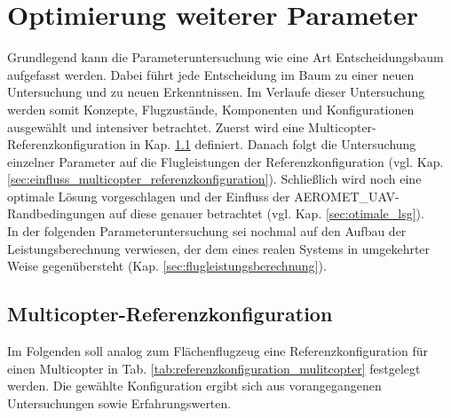 \chapter{Optimierung weiterer Parameter}
\label{chap:optimierung_parameter}
Grundlegend kann die Parameteruntersuchung wie eine Art Entscheidungsbaum aufgefasst werden. Dabei führt jede Entscheidung im Baum zu einer neuen Untersuchung und zu neuen Erkenntnissen. Im Verlaufe dieser Untersuchung werden somit Konzepte, Flugzustände, Komponenten und Konfigurationen ausgewählt und intensiver betrachtet. Zuerst wird eine Multicopter-Referenzkonfiguration in Kap. \ref{sec:multicopter_referenzkonfig} definiert. Danach folgt die Untersuchung einzelner Parameter auf die Flugleistungen der Referenzkonfiguration (vgl. Kap. \ref{sec:einfluss_multicopter_referenzkonfiguration}). Schließlich wird noch eine optimale Lösung vorgeschlagen und der Einfluss der AEROMET\_UAV-Randbedingungen auf diese genauer betrachtet (vgl. Kap. \ref{sec:otimale_lsg}).\\
In der folgenden Parameteruntersuchung sei nochmal auf den Aufbau der Leistungsberechnung verwiesen, der dem eines realen Systems in umgekehrter Weise gegenübersteht (Kap. \ref{sec:flugleistungsberechnung}).


\section{Multicopter-Referenzkonfiguration}
\label{sec:multicopter_referenzkonfig}
Im Folgenden soll analog zum Flächenflugzeug eine Referenzkonfiguration für einen Multicopter in Tab. \ref{tab:referenzkonfiguration_mulitcopter} festgelegt werden. Die gewählte Konfiguration ergibt sich aus vorangegangenen Untersuchungen sowie Erfahrungswerten. 

